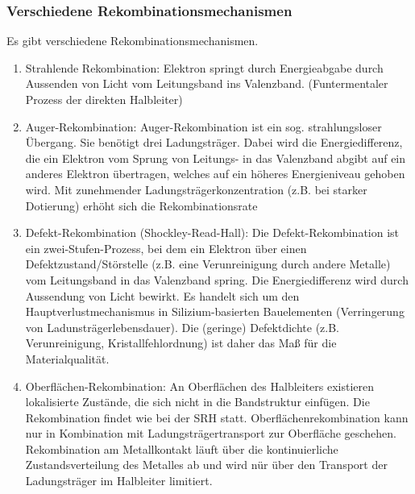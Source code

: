 	\subsubsection{Verschiedene Rekombinationsmechanismen}
	Es gibt verschiedene Rekombinationsmechanismen.
	\begin{enumerate}
		\item Strahlende Rekombination:
			\newline
			Elektron springt durch Energieabgabe durch Aussenden von Licht vom Leitungsband ins Valenzband. (Funtermentaler Prozess der direkten Halbleiter)
		\item Auger-Rekombination:
			\newline
			Auger-Rekombination ist ein sog. strahlungsloser Übergang. Sie benötigt drei Ladungsträger. Dabei wird die Energiedifferenz, die ein Elektron vom Sprung von Leitungs- in das Valenzband abgibt auf ein anderes Elektron übertragen, welches auf ein höheres Energieniveau gehoben wird. 
			\newline
			Mit zunehmender Ladungsträgerkonzentration (z.B. bei starker Dotierung) erhöht sich die Rekombinationsrate
		\item Defekt-Rekombination (Shockley-Read-Hall):
			\newline
			Die Defekt-Rekombination ist ein zwei-Stufen-Prozess, bei dem ein Elektron über einen Defektzustand/Störstelle (z.B. eine Verunreinigung durch andere Metalle) vom Leitungsband in das Valenzband spring. Die Energiedifferenz wird durch Aussendung von Licht bewirkt.
			\newline
			Es handelt sich um den Hauptverlustmechanismus in Silizium-basierten Bauelementen (Verringerung von Ladunsträgerlebensdauer). Die (geringe) Defektdichte (z.B. Verunreinigung, Kristallfehlordnung) ist daher das Maß für die Materialqualität.
		\item Oberflächen-Rekombination:
			\newline
			An Oberflächen des Halbleiters existieren lokalisierte Zustände,
			die sich nicht in die Bandstruktur einfügen. Die Rekombination findet wie bei der SRH statt.
			Oberflächenrekombination kann nur in Kombination mit Ladungsträgertransport zur Oberfläche geschehen.
			Rekombination am Metallkontakt läuft über die kontinuierliche
			Zustandsverteilung des Metalles ab und wird nür über den Transport der Ladungsträger im Halbleiter limitiert.
	\end{enumerate}



